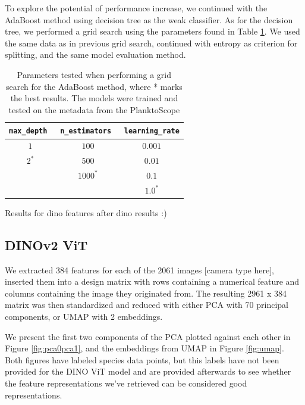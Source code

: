 To explore the potential of performance increase, we continued with the AdaBoost method using decision tree as the weak classifier. As for the decision tree, we performed a grid search using the parameters found in Table \ref{tab:params_adaboost}. We used the same data as in previous grid search, continued with entropy as criterion for splitting, and the same model evaluation method.
\begin{table}[h]
    \centering
    \begin{tabular}{ccc}
        \hline
        \verb|max_depth| \, & \verb|n_estimators| \, & \verb|learning_rate| \\
        \hline 
        $1$ & $100$ & $0.001$ \\
        $2^*$ & $500$ & $0.01$ \\
         & $1000^*$ & $0.1$ \\
         & & $1.0^*$ \\
        \hline
    \end{tabular}
    \caption{Parameters tested when performing a grid search for the AdaBoost method, where * marks the best results. The models were trained and tested on the metadata from the PlanktoScope}
    \label{tab:params_adaboost}
\end{table}

Results for dino features after dino results :)

%
%
\subsection{DINOv2 ViT}
We extracted 384 features for each of the 2061 images [camera type here], inserted them into a design matrix with rows containing a numerical feature and columns containing the image they originated from. The resulting 2961 x 384 matrix was then standardized and reduced with either PCA with 70 principal components, or UMAP with 2 embeddings. 

We present the first two components of the PCA plotted against each other in Figure \ref{fig:pca0pca1}, and the embeddings from UMAP in Figure \ref{fig:umap}. Both figures have labeled species data points, but this labels have not been provided for the DINO ViT model and are provided afterwards to see whether the feature representations we've retrieved can be considered good representations.

